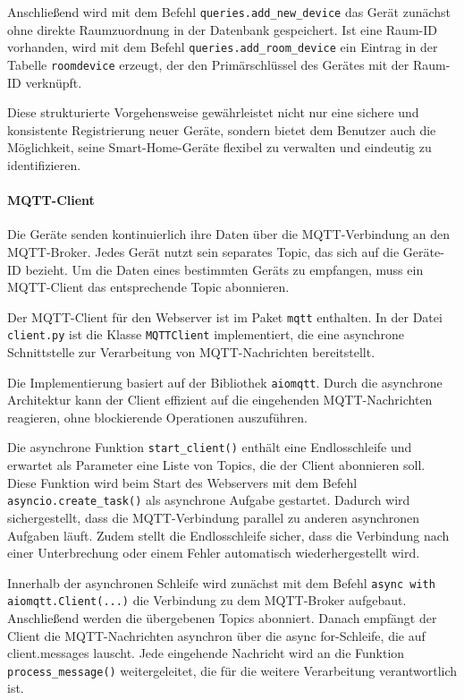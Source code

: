 \documentclass[12pt, letterpaper]{article}
\begin{document}
  \par Anschließend wird mit dem Befehl \texttt{queries.add\_new\_device} das Gerät zunächst ohne direkte Raumzuordnung in der Datenbank gespeichert. Ist eine Raum-ID vorhanden, wird mit dem Befehl \texttt{queries.add\_room\_device} ein Eintrag in der Tabelle \texttt{roomdevice} erzeugt, der den Primärschlüssel des Gerätes mit der Raum-ID verknüpft.
  \par Diese strukturierte Vorgehensweise gewährleistet nicht nur eine sichere und konsistente Registrierung neuer Geräte, sondern bietet dem Benutzer auch die Möglichkeit, seine Smart-Home-Geräte flexibel zu verwalten und eindeutig zu identifizieren.
  \paragraph{MQTT-Client}
  \par \textbf{}
  \par Die Geräte senden kontinuierlich ihre Daten über die MQTT-Verbindung an den MQTT-Broker. Jedes Gerät nutzt sein separates Topic, das sich auf die Geräte-ID bezieht. Um die Daten eines bestimmten Geräts zu empfangen, muss ein MQTT-Client das entsprechende Topic abonnieren.
  \par Der MQTT-Client für den Webserver ist im Paket \texttt{mqtt} enthalten. In der Datei \texttt{client.py} ist die Klasse \texttt{MQTTClient} implementiert, die eine asynchrone Schnittstelle zur Verarbeitung von MQTT-Nachrichten bereitstellt. 
  \par Die Implementierung basiert auf der Bibliothek \texttt{aiomqtt}. Durch die asynchrone Architektur kann der Client effizient auf die eingehenden MQTT-Nachrichten reagieren, ohne blockierende Operationen auszuführen.
  \par Die asynchrone Funktion \texttt{start\_client()} enthält eine Endlosschleife und erwartet als Parameter eine Liste von Topics, die der Client abonnieren soll. Diese Funktion wird beim Start des Webservers mit dem Befehl \texttt{asyncio.create\_task()} als asynchrone Aufgabe gestartet. Dadurch wird sichergestellt, dass die MQTT-Verbindung parallel zu anderen asynchronen Aufgaben läuft. Zudem stellt die Endlosschleife sicher, dass die Verbindung nach einer Unterbrechung oder einem Fehler automatisch wiederhergestellt wird.
  \par Innerhalb der asynchronen Schleife wird zunächst mit dem Befehl \texttt{async with aiomqtt.Client(...)} die Verbindung zu dem MQTT-Broker aufgebaut. Anschließend werden die übergebenen Topics abonniert. Danach empfängt der Client die MQTT-Nachrichten asynchron über die async for-Schleife, die auf client.messages lauscht. Jede eingehende Nachricht wird an die Funktion \texttt{process\_message()} weitergeleitet, die für die weitere Verarbeitung verantwortlich ist.
\end{document}
